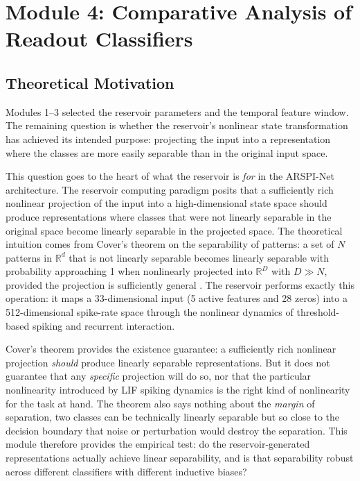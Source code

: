 \section{Module 4: Comparative Analysis of Readout Classifiers}
\label{sec:module4}

\subsection{Theoretical Motivation}

Modules 1--3 selected the reservoir parameters and the temporal feature window. The remaining question is whether the reservoir's nonlinear state transformation has achieved its intended purpose: projecting the input into a representation where the classes are more easily separable than in the original input space.

This question goes to the heart of what the reservoir is \emph{for} in the ARSPI-Net architecture. The reservoir computing paradigm posits that a sufficiently rich nonlinear projection of the input into a high-dimensional state space should produce representations where classes that were not linearly separable in the original space become linearly separable in the projected space. The theoretical intuition comes from Cover's theorem on the separability of patterns: a set of $N$ patterns in $\mathbb{R}^d$ that is not linearly separable becomes linearly separable with probability approaching 1 when nonlinearly projected into $\mathbb{R}^D$ with $D \gg N$, provided the projection is sufficiently general \cite{Cover1965}. The reservoir performs exactly this operation: it maps a 33-dimensional input (5 active features and 28 zeros) into a 512-dimensional spike-rate space through the nonlinear dynamics of threshold-based spiking and recurrent interaction.

Cover's theorem provides the existence guarantee: a sufficiently rich nonlinear projection \emph{should} produce linearly separable representations. But it does not guarantee that any \emph{specific} projection will do so, nor that the particular nonlinearity introduced by LIF spiking dynamics is the right kind of nonlinearity for the task at hand. The theorem also says nothing about the \emph{margin} of separation, two classes can be technically linearly separable but so close to the decision boundary that noise or perturbation would destroy the separation. This module therefore provides the empirical test: do the reservoir-generated representations actually achieve linear separability, and is that separability robust across different classifiers with different inductive biases?

